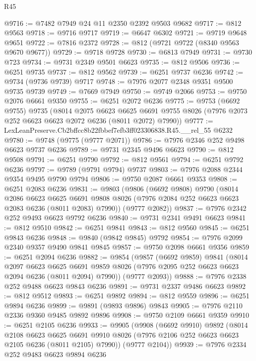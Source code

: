 \begin{lexlean}{R45}
\begin{coremodule}
{@9716 := @7482 @7949 @24 @11 @2350 @2392 @9503 @9682
@9717 := @812 @9563
@9718 := @9716 @9717
@9719 := @6647 @6302
@9721 := @9719 @9648 @9651
@9722 := @7816 @2372
@9728 := @812 (@9721 @9722 (@8340 @9563 @9670 @9677))
@9729 := @9718 @9728
@9730 := @6813 @7949
@9731 := @9730 @723
@9734 := @9731 @2349 @9501 @6623
@9735 := @812 @9506
@9736 := @6251 @9735
@9737 := @812 @9562
@9739 := @6251 @9737 @6236
@9742 := @9734 (@9736 @9739) @9717
@9748 := @7976 @2077 @2348 @9351 @9500 @9735 @9739
@9749 := @7669 @7949
@9750 := @9749 @2066
@9753 := @9750 @2076 @6661 @9350
@9755 := @6251 @2072 @6236
@9775 := @9753
    (@6692 @9755)
    @9735
    (@8014
      @2075
      @6623
      @6625
      @6691
      @9755
      @8026
      (@7976 @2073 @252 @6623 @6623 @2072 @6236 (@8011 @2072) @7990))
@9777 := LexLeanPreserve.Cb2bffcc8b22fbbef7efb3ff023306838.R45.__rel_55 @6232
@9780 := @9748 (@9775 (@9777 @2071))
@9786 := @7976 @2346 @252 @9498 @6623 @9737 @6236
@9789 := @9731 @2345 @9496 @6623
@9790 := @812 @9508
@9791 := @6251 @9790
@9792 := @812 @9561
@9794 := @6251 @9792 @6236
@9797 := @9789 (@9791 @9794) @9737
@9803 := @7976 @2088 @2344 @9354 @9495 @9790 @9794
@9806 := @9750 @2087 @6661 @9353
@9808 := @6251 @2083 @6236
@9831 := @9803
    (@9806
      (@6692 @9808)
      @9790
      (@8014
        @2086
        @6623
        @6625
        @6691
        @9808
        @8026
        (@7976 @2084 @252 @6623 @6623 @2083 @6236 (@8011 @2083) @7990))
      (@9777 @2082))
@9837 := @7976 @2342 @252 @9493 @6623 @9792 @6236
@9840 := @9731 @2341 @9491 @6623
@9841 := @812 @9510
@9842 := @6251 @9841
@9843 := @812 @9560
@9845 := @6251 @9843 @6236
@9848 := @9840 (@9842 @9845) @9792
@9854 := @7976 @2099 @2340 @9357 @9490 @9841 @9845
@9857 := @9750 @2098 @6661 @9356
@9859 := @6251 @2094 @6236
@9882 := @9854
    (@9857
      (@6692 @9859)
      @9841
      (@8014
        @2097
        @6623
        @6625
        @6691
        @9859
        @8026
        (@7976 @2095 @252 @6623 @6623 @2094 @6236 (@8011 @2094) @7990))
      (@9777 @2093))
@9888 := @7976 @2338 @252 @9488 @6623 @9843 @6236
@9891 := @9731 @2337 @9486 @6623
@9892 := @812 @9512
@9893 := @6251 @9892
@9894 := @812 @9559
@9896 := @6251 @9894 @6236
@9899 := @9891 (@9893 @9896) @9843
@9905 := @7976 @2110 @2336 @9360 @9485 @9892 @9896
@9908 := @9750 @2109 @6661 @9359
@9910 := @6251 @2105 @6236
@9933 := @9905
    (@9908
      (@6692 @9910)
      @9892
      (@8014
        @2108
        @6623
        @6625
        @6691
        @9910
        @8026
        (@7976 @2106 @252 @6623 @6623 @2105 @6236 (@8011 @2105) @7990))
      (@9777 @2104))
@9939 := @7976 @2334 @252 @9483 @6623 @9894 @6236
}
\end{coremodule}
\end{lexlean}
